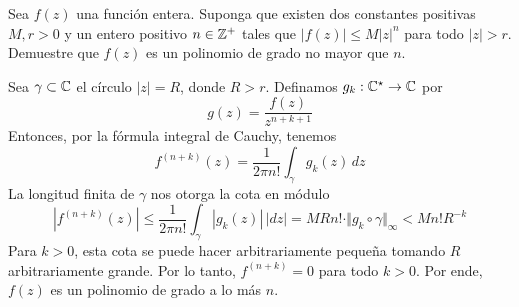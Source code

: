 \begin{exercise}
Sea $f(z)$ una función entera. Suponga que existen dos constantes positivas $M, r > 0$ y un entero positivo $n \in \mathbb Z^+$ tales que $|f(z)| \le M |z|^n$ para todo $|z| > r$. Demuestre que $f(z)$ es un polinomio de grado no mayor que $n$.
\end{exercise}

\begin{solution}
Sea $\gamma \subset \mathbb C$ el círculo $|z| = R$, donde $R > r$. Definamos $g_k : \mathbb C^\star \to \mathbb C$ por
$$g(z) = \frac {f(z)} {z^{n+k+1}}$$
Entonces, por la fórmula integral de Cauchy, tenemos
$$f^{(n+k)}(z) = \frac 1 {2\pi n!} \int_\gamma g_k(z) \, dz$$
La longitud finita de $\gamma$ nos otorga la cota en módulo
$$
|f^{(n+k)}(z)|
    \le \frac 1 {2\pi n!} \int_\gamma |g_k(z)| \, |dz|
    = MRn! \cdot \Vert g_k \circ \gamma \Vert_\infty
    < Mn!R^{-k}
$$
Para $k > 0$, esta cota se puede hacer arbitrariamente pequeña tomando $R$ arbitrariamente grande. Por lo tanto, $f^{(n+k)} = 0$ para todo $k > 0$. Por ende, $f(z)$ es un polinomio de grado a lo más $n$.
\end{solution}
